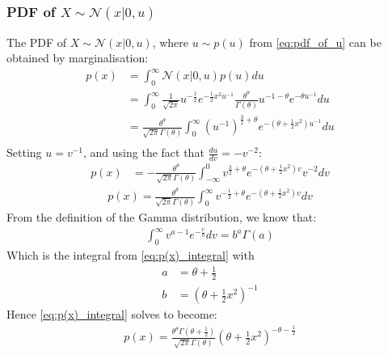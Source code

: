 \documentclass[a4paper]{article}
\begin{document}
\subsubsection{PDF of $X \sim \mathcal{N}(x | 0, u)$}
The PDF of $X \sim \mathcal{N}(x | 0, u)$, where $u \sim p(u)$ from \autoref{eq:pdf_of_u} can be obtained by
marginalisation:
\begin{align*}
    p(x) &= \int_0^\infty \mathcal{N}(x | 0, u) p(u) du \\
    &= \int_0^\infty \frac{1}{\sqrt{2\pi}} u^{-\frac{1}{2}} e^{-\frac{1}{2} x^2 u^{-1}}
    \frac{\theta^{\theta}}{\Gamma(\theta)} u^{-1-\theta} e^{-\theta u^{-1}} du \\
    &= \frac{\theta^{\theta}}{\sqrt{2\pi} \Gamma(\theta)}
    \int_0^\infty \left( u^{-1} \right) ^ {\frac{3}{2} + \theta} e^{-\left( \theta + \frac{1}{2} x^2 \right) u^{-1}} du \\
\end{align*}
Setting $u = v^{-1}$, and using the fact that $\frac{du}{dv} = -v^{-2}$:
\begin{align*}
    p(x) &= - \frac{\theta^{\theta}}{\sqrt{2\pi} \Gamma(\theta)}
    \int_{-\infty}^0 v ^ {\frac{3}{2} + \theta} e^{-\left( \theta + \frac{1}{2} x^2 \right) v} v^{-2} dv
\end{align*}
\begin{align}\label{eq:p(x)_integral}
    p(x) = \frac{\theta^{\theta}}{\sqrt{2\pi} \Gamma(\theta)}
    \int_0^\infty v ^ {-\frac{1}{2} + \theta} e^{-\left( \theta + \frac{1}{2} x^2 \right) v} dv
\end{align}
From the definition of the Gamma distribution, we know that:
\begin{align*}
    \int_0^\infty v ^ {a - 1} e^{-\frac{v}{b}} dv = b^a \Gamma(a)
\end{align*}
Which is the integral from \autoref{eq:p(x)_integral} with
\begin{align*}
    a &= \theta + \frac{1}{2} \\
    b &= \left(\theta + \frac{1}{2} x^2 \right) ^ {-1}
\end{align*}
Hence \autoref{eq:p(x)_integral} solves to become:
\begin{align}
    p(x) = \frac{\theta^{\theta} \Gamma\left(\theta + \frac{1}{2} \right)}{\sqrt{2\pi} \Gamma(\theta)}
    \left( \theta + \frac{1}{2}x^2 \right)^{-\theta - \frac{1}{2}}
\end{align}

\newpage
%
\end{document}
